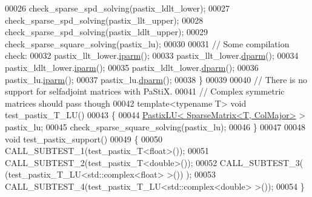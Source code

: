 \begin{DoxyCode}
00026   check\_sparse\_spd\_solving(pastix\_ldlt\_lower);
00027   check\_sparse\_spd\_solving(pastix\_llt\_upper);
00028   check\_sparse\_spd\_solving(pastix\_ldlt\_upper);
00029   check\_sparse\_square\_solving(pastix\_lu);
00030 
00031   \textcolor{comment}{// Some compilation check:}
00032   pastix\_llt\_lower.\hyperlink{class_eigen_1_1_pastix_base_a38378e7b2b5c750a8a23e2c21a69146c}{iparm}();
00033   pastix\_llt\_lower.\hyperlink{class_eigen_1_1_pastix_base_af4a29373aa3e6a980738efde33f92a76}{dparm}();
00034   pastix\_ldlt\_lower.\hyperlink{class_eigen_1_1_pastix_base_a38378e7b2b5c750a8a23e2c21a69146c}{iparm}();
00035   pastix\_ldlt\_lower.\hyperlink{class_eigen_1_1_pastix_base_af4a29373aa3e6a980738efde33f92a76}{dparm}();
00036   pastix\_lu.\hyperlink{class_eigen_1_1_pastix_base_a38378e7b2b5c750a8a23e2c21a69146c}{iparm}();
00037   pastix\_lu.\hyperlink{class_eigen_1_1_pastix_base_af4a29373aa3e6a980738efde33f92a76}{dparm}();
00038 \}
00039 
00040 \textcolor{comment}{// There is no support for selfadjoint matrices with PaStiX. }
00041 \textcolor{comment}{// Complex symmetric matrices should pass though}
00042 \textcolor{keyword}{template}<\textcolor{keyword}{typename} T> \textcolor{keywordtype}{void} test\_pastix\_T\_LU()
00043 \{
00044   \hyperlink{class_eigen_1_1_pastix_l_u}{PastixLU< SparseMatrix<T, ColMajor>} > pastix\_lu;
00045   check\_sparse\_square\_solving(pastix\_lu);
00046 \}
00047 
00048 \textcolor{keywordtype}{void} test\_pastix\_support()
00049 \{
00050   CALL\_SUBTEST\_1(test\_pastix\_T<float>());
00051   CALL\_SUBTEST\_2(test\_pastix\_T<double>());
00052   CALL\_SUBTEST\_3( (test\_pastix\_T\_LU<std::complex<float> >()) );
00053   CALL\_SUBTEST\_4(test\_pastix\_T\_LU<std::complex<double> >());
00054 \} 
\end{DoxyCode}
